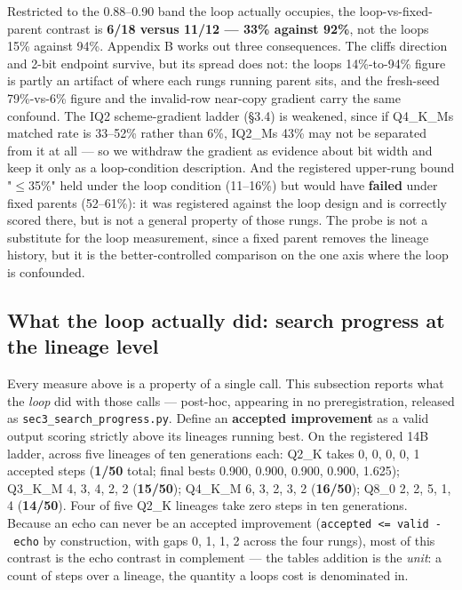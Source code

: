 Restricted to the 0.88--0.90 band the loop actually occupies, the loop-vs-fixed-parent contrast is \textbf{6/18 versus 11/12 --- 33\% against 92\%}, not the loop\textquotesingle s 15\% against 94\%. Appendix B works out three consequences. The cliff\textquotesingle s direction and 2-bit endpoint survive, but its spread does not: the loop\textquotesingle s 14\%-to-94\% figure is partly an artifact of where each rung\textquotesingle s running parent sits, and the fresh-seed 79\%-vs-6\% figure and the invalid-row near-copy gradient carry the same confound. The IQ2 scheme-gradient ladder (§3.4) is weakened, since if Q4\_K\_M\textquotesingle s matched rate is 33--52\% rather than 6\%, IQ2\_M\textquotesingle s 43\% may not be separated from it at all --- so we withdraw the gradient as evidence about bit width and keep it only as a loop-condition description. And the registered upper-rung bound "\(\leq\)35\%" held under the loop condition (11--16\%) but would have \textbf{failed} under fixed parents (52--61\%): it was registered against the loop design and is correctly scored there, but is not a general property of those rungs. The probe is not a substitute for the loop measurement, since a fixed parent removes the lineage history, but it is the better-controlled comparison on the one axis where the loop is confounded.

\hypertarget{what-the-loop-actually-did-search-progress-at-the-lineage-level}{%
\subsection{What the loop actually did: search progress at the lineage level}\label{what-the-loop-actually-did-search-progress-at-the-lineage-level}}

Every measure above is a property of a single call. This subsection reports what the \emph{loop} did with those calls --- post-hoc, appearing in no preregistration, released as \texttt{sec3\_search\_progress.py}. Define an \textbf{accepted improvement} as a valid output scoring strictly above its lineage\textquotesingle s running best. On the registered 14B ladder, across five lineages of ten generations each: Q2\_K takes 0, 0, 0, 0, 1 accepted steps (\textbf{1/50} total; final bests 0.900, 0.900, 0.900, 0.900, 1.625); Q3\_K\_M 4, 3, 4, 2, 2 (\textbf{15/50}); Q4\_K\_M 6, 3, 2, 3, 2 (\textbf{16/50}); Q8\_0 2, 2, 5, 1, 4 (\textbf{14/50}). Four of five Q2\_K lineages take zero steps in ten generations. Because an echo can never be an accepted improvement (\texttt{accepted\ \textless{}=\ valid\ -\ echo} by construction, with gaps 0, 1, 1, 2 across the four rungs), most of this contrast is the echo contrast in complement --- the table\textquotesingle s addition is the \emph{unit}: a count of steps over a lineage, the quantity a loop\textquotesingle s cost is denominated in.

